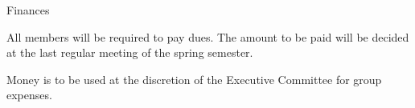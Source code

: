 {
	\begin{article}{Finances}
		\item All members will be required to pay dues.  The amount to be paid will be decided at the last regular meeting of the spring semester.
		\item Money is to be used at the discretion of the Executive Committee for group expenses.
	\end{article}
}